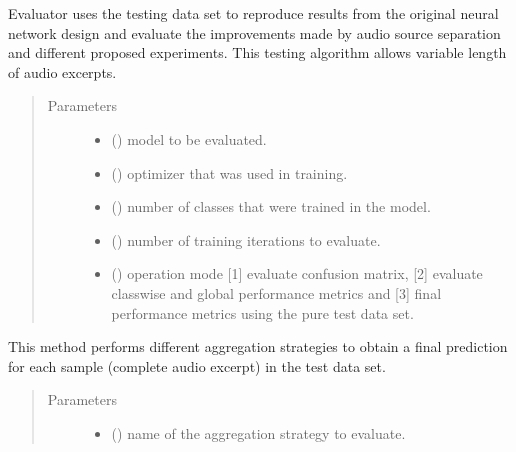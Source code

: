 \documentclass[letterpaper,10pt,english]{sphinxmanual}
\begin{document}
\begin{fulllineitems}
\label{\detokenize{evaluate:evaluate.Evaluator}}
Evaluator uses the testing data set to reproduce results from the 
original neural network design and evaluate the improvements made by 
audio source separation and different proposed experiments. This testing
algorithm allows variable length of audio excerpts.
\begin{quote}\begin{description}
\item[{Parameters}] \leavevmode\begin{itemize}
\item {} 
 () \textendash{} model to be evaluated.

\item {} 
 () \textendash{} optimizer that was used in training.

\item {} 
 () \textendash{} number of classes that were trained in the model.

\item {} 
 () \textendash{} number of training iterations to evaluate.

\item {} 
 () \textendash{} operation mode {[}1{]} evaluate confusion matrix, {[}2{]} evaluate classwise and global performance metrics and {[}3{]} final performance metrics using the pure test data set.

\end{itemize}

\end{description}\end{quote}

\begin{fulllineitems}
\label{\detokenize{evaluate:evaluate.Evaluator.aggregate_predictions}}
This method performs different aggregation strategies to obtain a final
prediction for each sample (complete audio excerpt) in the test data set.
\begin{quote}\begin{description}
\item[{Parameters}] \leavevmode\begin{itemize}
\item {} 
 () \textendash{} name of the aggregation strategy to evaluate.


\end{itemize}
\end{description}
\end{quote}
\end{fulllineitems}
\end{fulllineitems}
\end{document}
